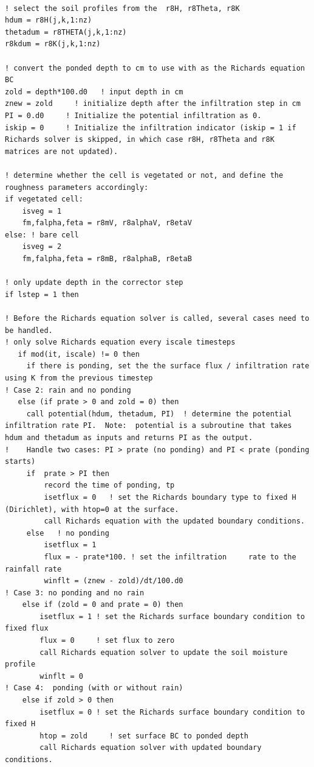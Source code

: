\documentclass{article}
\begin{document}
\begin{lstlisting}

! select the soil profiles from the  r8H, r8Theta, r8K 
hdum = r8H(j,k,1:nz)
thetadum = r8THETA(j,k,1:nz)   
r8kdum = r8K(j,k,1:nz) 

! convert the ponded depth to cm to use with as the Richards equation BC
zold = depth*100.d0   ! input depth in cm
znew = zold     ! initialize depth after the infiltration step in cm
PI = 0.d0     ! Initialize the potential infiltration as 0.
iskip = 0     ! Initialize the infiltration indicator (iskip = 1 if Richards solver is skipped, in which case r8H, r8Theta and r8K  matrices are not updated). 

! determine whether the cell is vegetated or not, and define the roughness parameters accordingly:
if vegetated cell:
    isveg = 1
    fm,falpha,feta = r8mV, r8alphaV, r8etaV
else: ! bare cell
	isveg = 2
    fm,falpha,feta = r8mB, r8alphaB, r8etaB	

! only update depth in the corrector step
if lstep = 1 then

! Before the Richards equation solver is called, several cases need to be handled. 
! only solve Richards equation every iscale timesteps
   if mod(it, iscale) != 0 then 
     if there is ponding, set the the surface flux / infiltration rate using K from the previous timestep
! Case 2: rain and no ponding
   else (if prate > 0 and zold = 0) then
     call potential(hdum, thetadum, PI)  ! determine the potential infiltration rate PI.  Note:  potential is a subroutine that takes hdum and thetadum as inputs and returns PI as the output.
!    Handle two cases: PI > prate (no ponding) and PI < prate (ponding starts)
     if  prate > PI then
         record the time of ponding, tp
	     isetflux = 0   ! set the Richards boundary type to fixed H (Dirichlet), with htop=0 at the surface.
	     call Richards equation with the updated boundary conditions.	   
     else 	! no ponding
     	 isetflux = 1
     	 flux = - prate*100. ! set the infiltration 	rate to the rainfall rate       
	     winflt = (znew - zold)/dt/100.d0 
! Case 3: no ponding and no rain
    else if (zold = 0 and prate = 0) then
	    isetflux = 1 ! set the Richards surface boundary condition to fixed flux
		flux = 0     ! set flux to zero
		call Richards equation solver to update the soil moisture profile
		winflt = 0
! Case 4:  ponding (with or without rain)
	else if zold > 0 then
	    isetflux = 0 ! set the Richards surface boundary condition to fixed H
		htop = zold     ! set surface BC to ponded depth
		call Richards equation solver with updated boundary conditions.
	    

\end{lstlisting}
\end{document}
